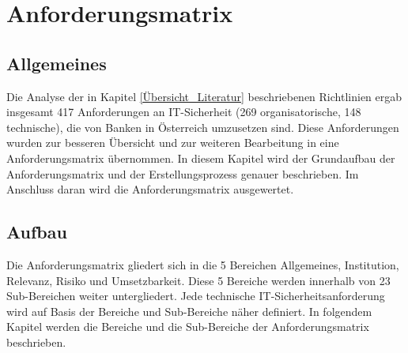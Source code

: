 \setlength{\parindent}{0em} 

\chapter{Anforderungsmatrix}\label{Anforderungsmatrix}

\section{Allgemeines}
Die Analyse der in Kapitel \ref{Übersicht_Literatur} beschriebenen Richtlinien ergab insgesamt 417 Anforderungen an IT-Sicherheit (269 organisatorische, 148 technische), die von Banken in Österreich umzusetzen sind. 
Diese Anforderungen wurden zur besseren Übersicht und zur weiteren Bearbeitung in eine Anforderungsmatrix übernommen. In diesem Kapitel wird der Grundaufbau der Anforderungsmatrix und der Erstellungsprozess genauer beschrieben. Im Anschluss daran wird die Anforderungsmatrix ausgewertet. 

\section{Aufbau}
Die Anforderungsmatrix gliedert sich in die 5 Bereichen \glqq{}Allgemeines\grqq{}, \glqq{}Institution\grqq{}, \glqq{}Relevanz\grqq{}, \glqq{}Risiko\grqq{} und \glqq{}Umsetzbarkeit\grqq{}.
Diese 5 Bereiche werden innerhalb von 23 Sub-Bereichen weiter untergliedert. Jede technische IT-Sicherheitsanforderung wird auf Basis der Bereiche und Sub-Bereiche näher definiert. 
\bigbreak
In folgendem Kapitel werden die Bereiche und die Sub-Bereiche der Anforderungsmatrix beschrieben. 

